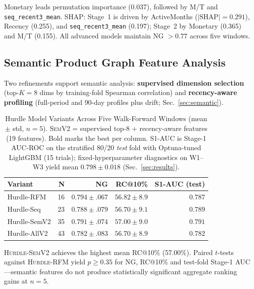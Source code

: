 \documentclass[pdflatex,sn-mathphys-num]{sn-jnl}
\theoremstyle{thmstyleone}
\theoremstyle{thmstyletwo}
\theoremstyle{thmstylethree}
\begin{document}
Monetary leads permutation importance (0.037), followed by M/T and
\texttt{seq\_recent3\_mean}. SHAP: Stage~1 is driven by ActiveMonths
($|\mathrm{SHAP}|{=}0.291$), Recency (0.255), and
\texttt{seq\_recent3\_mean} (0.197); Stage~2 by Monetary (0.365) and M/T
(0.155). All advanced models maintain NG $>0.77$ across five windows.

\subsection{Semantic Product Graph Feature Analysis}
\label{sec:sem_results}

Two refinements support semantic analysis: \textbf{supervised dimension
selection} (top-$K{=}8$ dims by training-fold Spearman correlation) and
\textbf{recency-aware profiling} (full-period and 90-day profiles plus
drift; Sec.~\ref{sec:semantic}).

\begin{table}[h]
\caption{Hurdle Model Variants Across Five Walk-Forward Windows
(mean $\pm$ std, $n{=}5$). \textsc{SemV2} = supervised top-8 +
recency-aware features (19 features). Bold marks the best per column.
S1-AUC is Stage-1 AUC-ROC on the stratified 80/20 \emph{test} fold with
Optuna-tuned LightGBM (15 trials); fixed-hyperparameter diagnostics on
W1--W3 yield mean $0.798 \pm 0.018$ (Sec.~\ref{sec:results}).}
\label{tab:sem_variants}
\small
\begin{tabular*}{\columnwidth}{@{\extracolsep\fill}lrrrr@{}}
\toprule
\textbf{Variant} & \textbf{N} & \textbf{NG} & \textbf{RC@10\%} &
\textbf{S1-AUC (test)} \\
\midrule
Hurdle-RFM    & 16 & $\mathbf{0.794{\pm}.067}$ & $56.82{\pm}8.9$ & $0.787$ \\
Hurdle-Seq    & 23 & $0.788{\pm}.079$ & $56.70{\pm}9.1$ & $0.789$ \\
Hurdle-SemV2  & 35 & $0.791{\pm}.074$ & $\mathbf{57.00{\pm}9.0}$ & $\mathbf{0.791}$ \\
Hurdle-AllV2  & 43 & $0.782{\pm}.083$ & $56.70{\pm}8.9$ & $0.782$ \\
\bottomrule
\end{tabular*}
\end{table}

\textsc{Hurdle-SemV2} achieves the highest mean RC@10\% (57.00\%).
Paired $t$-tests against \textsc{Hurdle-RFM} yield $p \geq 0.35$ for
NG, RC@10\% and test-fold Stage-1 AUC---semantic features do not
produce statistically significant aggregate ranking gains at $n{=}5$.
\end{document}
